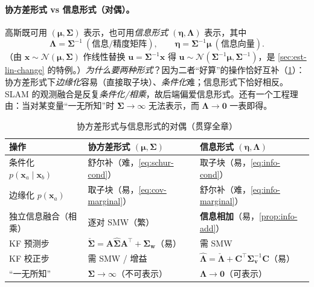\paragraph{协方差形式 vs 信息形式（对偶）。}
高斯既可用 $(\boldsymbol{\mu},\boldsymbol{\Sigma})$ 表示，也可用\emph{信息形式} $(\boldsymbol{\eta},\boldsymbol{\Lambda})$ 表示，其中
\begin{equation}
  \boldsymbol{\Lambda}=\boldsymbol{\Sigma}^{-1}\ (\text{信息/精度矩阵}),\qquad
  \boldsymbol{\eta}=\boldsymbol{\Sigma}^{-1}\boldsymbol{\mu}\ (\text{信息向量}).
  \label{eq:info-form}
\end{equation}
（由 $\mathbf{x}\sim\mathcal{N}(\boldsymbol{\mu},\boldsymbol{\Sigma})$ 作线性替换 $\mathbf{u}=\boldsymbol{\Sigma}^{-1}\mathbf{x}$ 得 $\mathbf{u}\sim\mathcal{N}(\boldsymbol{\Sigma}^{-1}\boldsymbol{\mu},\boldsymbol{\Sigma}^{-1})$，是 \cref{sec:est-lin-change} 的特例。）\emph{为什么要两种形式}？因为二者“好算”的操作恰好互补（\cref{tab:cov-info}）：协方差形式下\emph{边缘化}容易（直接取子块）、\emph{条件化}难；信息形式下恰好相反。SLAM 的观测融合是反复\emph{条件化/相乘}，故后端偏爱信息形式。还有一个工程理由：当对某变量“一无所知”时 $\boldsymbol{\Sigma}\to\infty$ 无法表示，而 $\boldsymbol{\Lambda}\to\mathbf{0}$ 一表即得。

\begin{table}[ht]\centering\small
\caption{协方差形式与信息形式的对偶（贯穿全章）}
\label{tab:cov-info}
\begin{tabular}{lll}
\toprule
操作 & 协方差形式 $(\boldsymbol{\mu},\boldsymbol{\Sigma})$ & 信息形式 $(\boldsymbol{\eta},\boldsymbol{\Lambda})$ \\
\midrule
条件化 $p(\mathbf{x}_a\mid\mathbf{x}_b)$ & 舒尔补（难，\cref{eq:schur-cond}） & 取子块（易，\cref{eq:info-cond}） \\
边缘化 $p(\mathbf{x}_a)$ & 取子块（易，\cref{eq:cov-marginal}） & 舒尔补（难，\cref{eq:info-marginal}） \\
独立信息融合（相乘） & 逐对 SMW（繁） & \textbf{信息相加}（易，\cref{prop:info-add}） \\
KF 预测步 & $\check{\boldsymbol{\Sigma}}=\mathbf{A}\hat{\boldsymbol{\Sigma}}\mathbf{A}^\top+\boldsymbol{\Sigma}_{\mathbf{w}}$（易） & 需 SMW \\
KF 校正步 & 需 SMW / 增益 & $\hat{\boldsymbol{\Lambda}}=\check{\boldsymbol{\Lambda}}+\mathbf{C}^\top\boldsymbol{\Sigma}_{\mathbf{v}}^{-1}\mathbf{C}$（易） \\
“一无所知” & $\boldsymbol{\Sigma}\to\infty$（不可表示） & $\boldsymbol{\Lambda}\to\mathbf{0}$（可表示） \\
\bottomrule
\end{tabular}
\end{table}

